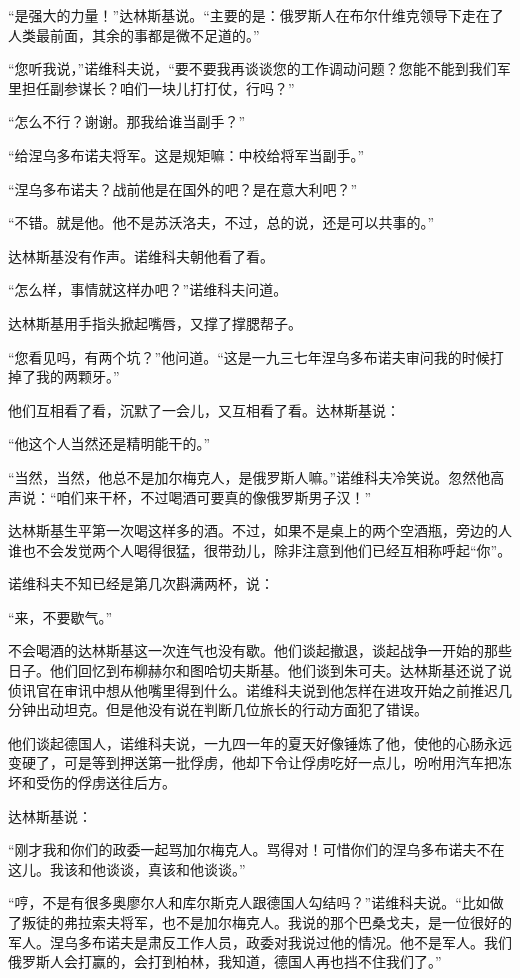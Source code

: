 “是强大的力量！”达林斯基说。“主要的是：俄罗斯人在布尔什维克领导下走在了人类最前面，其余的事都是微不足道的。”

“您听我说，”诺维科夫说，“要不要我再谈谈您的工作调动问题？您能不能到我们军里担任副参谋长？咱们一块儿打打仗，行吗？”

“怎么不行？谢谢。那我给谁当副手？”

“给涅乌多布诺夫将军。这是规矩嘛：中校给将军当副手。”

“涅乌多布诺夫？战前他是在国外的吧？是在意大利吧？”

“不错。就是他。他不是苏沃洛夫，不过，总的说，还是可以共事的。”

达林斯基没有作声。诺维科夫朝他看了看。

“怎么样，事情就这样办吧？”诺维科夫问道。

达林斯基用手指头掀起嘴唇，又撑了撑腮帮子。

“您看见吗，有两个坑？”他问道。“这是一九三七年涅乌多布诺夫审问我的时候打掉了我的两颗牙。”

他们互相看了看，沉默了一会儿，又互相看了看。达林斯基说：

“他这个人当然还是精明能干的。”

“当然，当然，他总不是加尔梅克人，是俄罗斯人嘛。”诺维科夫冷笑说。忽然他高声说：“咱们来干杯，不过喝酒可要真的像俄罗斯男子汉！”

达林斯基生平第一次喝这样多的酒。不过，如果不是桌上的两个空酒瓶，旁边的人谁也不会发觉两个人喝得很猛，很带劲儿，除非注意到他们已经互相称呼起“你”。

诺维科夫不知已经是第几次斟满两杯，说：

“来，不要歇气。”

不会喝酒的达林斯基这一次连气也没有歇。他们谈起撤退，谈起战争一开始的那些日子。他们回忆到布柳赫尔和图哈切夫斯基。他们谈到朱可夫。达林斯基还说了说侦讯官在审讯中想从他嘴里得到什么。诺维科夫说到他怎样在进攻开始之前推迟几分钟出动坦克。但是他没有说在判断几位旅长的行动方面犯了错误。

他们谈起德国人，诺维科夫说，一九四一年的夏天好像锤炼了他，使他的心肠永远变硬了，可是等到押送第一批俘虏，他却下令让俘虏吃好一点儿，吩咐用汽车把冻坏和受伤的俘虏送往后方。

达林斯基说：

“刚才我和你们的政委一起骂加尔梅克人。骂得对！可惜你们的涅乌多布诺夫不在这儿。我该和他谈谈，真该和他谈谈。”

“哼，不是有很多奥廖尔人和库尔斯克人跟德国人勾结吗？”诺维科夫说。“比如做了叛徒的弗拉索夫将军，也不是加尔梅克人。我说的那个巴桑戈夫，是一位很好的军人。涅乌多布诺夫是肃反工作人员，政委对我说过他的情况。他不是军人。我们俄罗斯人会打赢的，会打到柏林，我知道，德国人再也挡不住我们了。”

